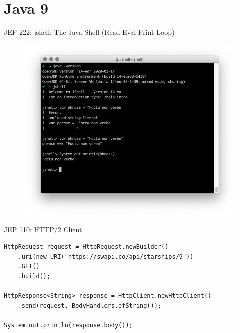 \documentclass[aspectratio=169]{beamer}
\begin{document}
{
    \section{Java 9}
}



\begin{frame}[fragile]{JEP 222: jshell: The Java Shell (Read-Eval-Print Loop)}
    \begin{figure}
        \centering
        \includegraphics[width=0.9\linewidth]{Images/jshell}
    \end{figure}
    
\end{frame}

\begin{frame}[fragile]{JEP 110: HTTP/2 Client }
\begin{lstlisting}
HttpRequest request = HttpRequest.newBuilder()
    .uri(new URI("https://swapi.co/api/starships/9"))
    .GET()
    .build();

HttpResponse<String> response = HttpClient.newHttpClient()
    .send(request, BodyHandlers.ofString());
    
System.out.println(response.body());
\end{lstlisting}
\end{frame}
\end{document}
